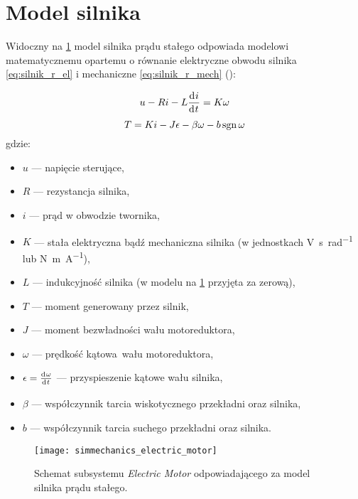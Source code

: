 \section{Model silnika}
\label{sec:ch4_model_silnika}

Widoczny na \cref{fig:sm_electric_motor} model silnika prądu stałego odpowiada modelowi matematycznemu opartemu o równanie elektryczne obwodu silnika \eqref{eq:silnik_r_el} i mechaniczne \eqref{eq:silnik_r_mech} (\cite{SILNIKIEL}):

\begin{equation}\label{eq:silnik_r_el}
    u - R i - L \deriv{i}{t} = K \omega 
\end{equation}
\begin{equation}\label{eq:silnik_r_mech}
    T = K i - J \epsilon - \beta \omega - b \operatorname{sgn} \omega
\end{equation}
gdzie:
\begin{itemize}
    \item $u$ --- napięcie sterujące,
    \item $R$ --- rezystancja silnika,
    \item $i$ --- prąd w obwodzie twornika,
    \item $K$ --- stała elektryczna bądź mechaniczna silnika (w jednostkach \si{\volt\second\per\radian} lub \si{\newton\meter\per\ampere}),
    \item $L$ --- indukcyjność silnika (w modelu na \cref{fig:sm_electric_motor} przyjęta za zerową),
    \item $T$ --- moment generowany przez silnik,
    \item $J$ --- moment bezwładności wału motoreduktora,
    \item $\omega$ --- prędkość kątowa wału motoreduktora,
    \item $\epsilon = \deriv{\omega}{t}$ --- przyspieszenie kątowe wału silnika,
    \item $\beta$ --- współczynnik tarcia wiskotycznego przekładni oraz silnika,
    \item $b$ --- współczynnik tarcia suchego przekładni oraz silnika.
\end{itemize}

\begin{figure}[h]
    \centering
    \texttt{[image: simmechanics\_electric\_motor]}
    \caption{Schemat subsystemu \textit{Electric Motor} odpowiadającego za model silnika prądu stałego.}
    \label{fig:sm_electric_motor}
\end{figure}

